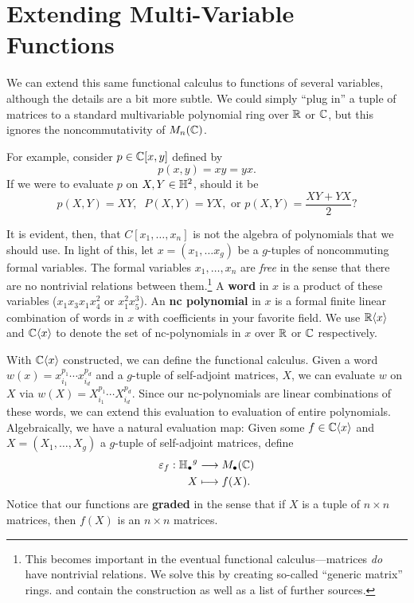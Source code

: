 \section{Extending Multi-Variable Functions}%
\label{sec:ExtMuliVarFun}

We can extend this same functional calculus to functions of several variables,
although the details are a bit more subtle. We could simply ``plug in'' a tuple
of matrices to a standard multivariable polynomial ring over \(\mathbb{R} \) or
\(\mathbb{C} \), but this ignores the noncommutativity of \(M_n(\mathbb{C})\).

For example, consider \(p \in \mathbb{C} [x,y]\) defined by
\[
  p(x,y) = xy = yx.
\]
If we were to evaluate \(p\) on \(X,Y \in \mathbb{H}^2\), should it be
\[
  p(X,Y) = XY, \;\; P(X,Y)=YX, \textrm{ or } p(X,Y) = \frac{XY+YX}{2}?
\]

It is evident, then, that \(C[x_1, \dots,x_n]\) is not the algebra of
polynomials that we should use.
In light of this,
let \(x = (x_1 , \dots x_g)\) be a
\(g\)-tuples of noncommuting formal variables. The formal variables
\(x_1, \dots , x_n\) are \emph{free} in the sense that there are no nontrivial
relations between them.\footnote{This becomes important in the eventual
  functional calculus---matrices \emph{do} have nontrivial relations. We solve
  this by creating so-called ``generic matrix'' rings. \cite{klepPositive2018}
  and \cite{klepTracepositive2011}
  contain the construction as well as a list of further sources.}
A \textbf{word} in \(x\) is a product of these
variables (\eg \(x_1x_3x_1x_4^2\) or \(x_1^2x_5^3\)). An \textbf{nc polynomial}
in \(x\) is a formal finite linear combination of words in \(x\) with
coefficients in your favorite field. We use \(\mathbb{R} \langle x \rangle\) and
\(\mathbb{C} \langle x \rangle\) to denote the set of nc-polynomials in \(x\) over
\(\mathbb{R} \) or \(\mathbb{C} \) respectively.

With \(\mathbb{C} \langle x \rangle \) constructed, we can define the functional
calculus. Given a word \(w(x) = x_{i_1}^{p_1}\cdots x_{i_d}^{p_d}\) and a
\(g\)-tuple of self-adjoint matrices, \(X\), we can evaluate \(w\) on \(X\) via
\(w(X) = X_{i_1}^{p_1}\cdots X_{i_d}^{p_d}\). Since our nc-polynomials are
linear combinations of these words, we can extend this evaluation to evaluation
of entire polynomials. Algebraically, we have a natural evaluation map:
Given some \(f \in \mathbb{C} \langle x \rangle \) and
\(X = \left( X_1, \dots ,X_g \right) \) a
\(g\)-tuple of self-adjoint matrices, define
\begin{align*}
  \varepsilon_f: {\mathbb{H}_\bullet}^g &\longrightarrow M_\bullet(\mathbb{C}) \\
             X &\longmapsto f(X)
.\end{align*}
Notice that our functions are \textbf{graded} in the sense that if \(X\) is a
tuple of \(n \times n\) matrices, then \(f(X)\) is an
\(n \times n\) matrices.

